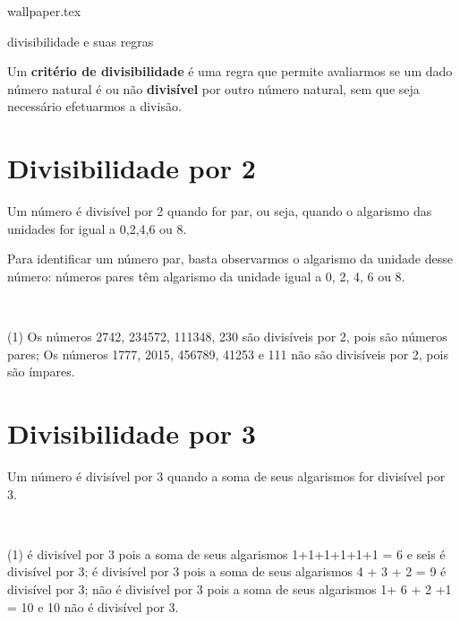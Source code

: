 \documentclass[10pt]{article}
\begin{document}
    {wallpaper.tex} %
        \begin{center}
            {\LARGE {\sc divisibilidade e suas regras}}
        \end{center}

\begin{definicao}
Um \textbf{critério de divisibilidade} é uma regra que permite avaliarmos se um dado número natural é ou não \textbf{divisível} por outro número natural, sem que seja necessário efetuarmos a divisão.
\end{definicao}

\section*{Divisibilidade por 2}
Um número é divisível por 2 quando for par, ou seja,
quando o algarismo das unidades for igual a 0,2,4,6 ou 8.
    \begin{obs}
        Para identificar um número par, basta observarmos o
        algarismo da unidade desse número: números pares têm
        algarismo da unidade igual a 0, 2, 4, 6 ou 8.
    \end{obs}

\begin{exemplo} ~\\
\begin{tasks}(1)
    \task Os números 2742, 234572, 111348, 230 são divisíveis por 2, pois são números pares;
    \task Os números 1777, 2015, 456789, 41253 e 111 não são divisíveis por 2, pois são ímpares.
\end{tasks}
    
\end{exemplo}

\section*{Divisibilidade por 3}
Um número é divisível por 3 quando a soma de seus algarismos for divisível por 3. 

\begin{exemplo}~\\

\begin{tasks}(1)
         é divisível por 3 pois a soma de seus algarismos 1+1+1+1+1+1 = 6 e seis é divisível por 3;
         é divisível por 3 pois a soma de seus algarismos 4 + 3 + 2 = 9 é divisível por 3;
         não é divisível por 3 pois a soma de seus algarismos 1+ 6 + 2 +1 = 10 e 10 não é divisível por 3.
    \end{tasks}
\end{exemplo}
\end{document}

